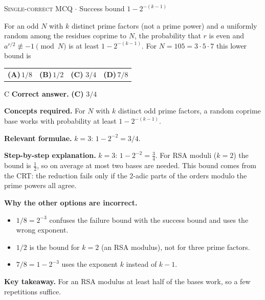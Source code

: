 \documentclass[11pt,a4paper]{article}
\newcommand{\optlabel}[1]{\textbf{(#1)}}
\newcommand{\correctlabel}[1]{\textcolor{okgreen}{\textbf{(#1)}\,\ding{51}}}
\newenvironment{qitem}[1]{\begin{list}{}{\setlength{\leftmargin}{3.3em}\setlength{\labelwidth}{3.1em}%
  \setlength{\labelsep}{0.2em}\setlength{\topsep}{3pt}\setlength{\parsep}{3pt}}\item[\textbf{Q.#1}\hfill]}{\end{list}}
\newcommand{\qsep}{\par\vspace{2pt}{\color{black!15}\hrule}\vspace{4pt}}
\newcommand{\qmeta}[2]{{\footnotesize\color{black!60}\textsc{#1} \;$\cdot$\; #2}\par}
\begin{document}
\begin{qitem}{14}
\qmeta{Single-correct MCQ}{Success bound $1 - 2^{-(k-1)}$}
For an odd $N$ with $k$ distinct prime factors (not a prime power) and $a$ uniformly random among the residues coprime to $N$, the probability
that $r$ is even and $a^{r/2} \not\equiv -1 \pmod N$ is at least $1 - 2^{-(k-1)}$. For $N = 105 = 3\cdot5\cdot7$ this lower bound is
\par\smallskip\noindent\begin{tabularx}{\linewidth}{@{}*{4}{L}@{}}
\optlabel{A}\,$1/8$ & \optlabel{B}\,$1/2$ & \correctlabel{C}\,$3/4$ & \optlabel{D}\,$7/8$
\end{tabularx}
\end{qitem}
\begin{solbox}{C}
\textbf{\color{brand}Correct answer.} \textcolor{okgreen}{\textbf{(C)}} $3/4$

\textbf{\color{brand}Concepts required.} For $N$ with $k$ distinct odd prime factors, a random coprime base works with probability at least $1 - 2^{-(k-1)}$.

\textbf{\color{brand}Relevant formulae.} $k = 3$: $1 - 2^{-2} = 3/4$.

\textbf{\color{brand}Step-by-step explanation.} $k = 3$: $1 - 2^{-2} = \frac34$. For RSA moduli ($k = 2$) the bound is $\frac12$, so on average at most two bases are needed. This bound comes from
the CRT: the reduction fails only if the 2-adic parts of the orders modulo the prime powers all agree.

\textbf{\color{brand}Why the other options are incorrect.}
\begin{itemize}[leftmargin=2.4em, itemsep=1pt, topsep=2pt]
\item[\textbf{(A)}] $1/8 = 2^{-3}$ confuses the failure bound with the success bound and uses the wrong exponent.
\item[\textbf{(B)}] $1/2$ is the bound for $k = 2$ (an RSA modulus), not for three prime factors.
\item[\textbf{(D)}] $7/8 = 1 - 2^{-3}$ uses the exponent $k$ instead of $k - 1$.
\end{itemize}
\textbf{\color{brand}Key takeaway.} For an RSA modulus at least half of the bases work, so a few repetitions suffice.
\end{solbox}
\qsep
\end{document}
